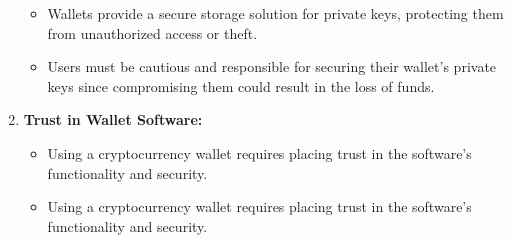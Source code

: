 \documentclass{report}
\begin{document}
\begin{enumerate}
	\begin{itemize}
		\item Wallets provide a secure storage solution for private keys, protecting them from unauthorized access or theft.
		\item Users must be cautious and responsible for securing their wallet's private keys since compromising them could result in the loss of funds.
	\end{itemize}
	\item \textbf{Trust in Wallet Software:}
	\begin{itemize}
		\item Using a cryptocurrency wallet requires placing trust in the software's functionality and security.
		\item Using a cryptocurrency wallet requires placing trust in the software's functionality and security.
	\end{itemize}
\end{enumerate}
\end{document}
